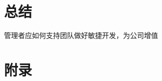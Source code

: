 \documentclass{book}        %
\begin{document}









\part{总结} 管理者应如何支持团队做好敏捷开发，为公司增值\\





\part{附录}




\end{document}
